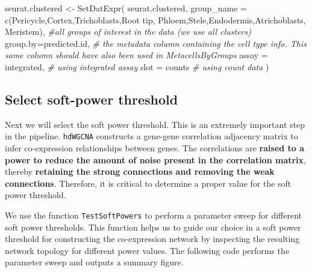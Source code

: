 \documentclass[
  letterpaper,
  DIV=11,
  numbers=noendperiod]{scrartcl}
\newenvironment{Shaded}{\begin{snugshade}}{\end{snugshade}}
\newcommand{\AttributeTok}[1]{\textcolor[rgb]{0.49,0.56,0.16}{#1}}
\newcommand{\CommentTok}[1]{\textcolor[rgb]{0.38,0.63,0.69}{\textit{#1}}}
\newcommand{\FunctionTok}[1]{\textcolor[rgb]{0.02,0.16,0.49}{#1}}
\newcommand{\NormalTok}[1]{\textcolor[rgb]{0.00,0.44,0.13}{#1}}
\newcommand{\OtherTok}[1]{\textcolor[rgb]{0.00,0.44,0.13}{#1}}
\newcommand{\StringTok}[1]{\textcolor[rgb]{0.25,0.44,0.63}{#1}}
\begin{document}
\begin{Shaded}
\begin{Highlighting}[]
\NormalTok{seurat.clustered }\OtherTok{\textless{}{-}} \FunctionTok{SetDatExpr}\NormalTok{(}
\NormalTok{  seurat.clustered,}
  \AttributeTok{group\_name =} \FunctionTok{c}\NormalTok{(}\StringTok{\textquotesingle{}Pericycle\textquotesingle{}}\NormalTok{,}\StringTok{\textquotesingle{}Cortex\textquotesingle{}}\NormalTok{,}\StringTok{\textquotesingle{}Trichoblasts\textquotesingle{}}\NormalTok{,}\StringTok{\textquotesingle{}Root tip\textquotesingle{}}\NormalTok{,}
                 \StringTok{\textquotesingle{}Phloem\textquotesingle{}}\NormalTok{,}\StringTok{\textquotesingle{}Stele\textquotesingle{}}\NormalTok{,}\StringTok{\textquotesingle{}Endodermis\textquotesingle{}}\NormalTok{,}\StringTok{\textquotesingle{}Atrichoblasts\textquotesingle{}}\NormalTok{,}
                 \StringTok{\textquotesingle{}Meristem\textquotesingle{}}\NormalTok{), }\CommentTok{\#all groups of interest in the data (we use all clusters)}
  \AttributeTok{group.by=}\StringTok{\textquotesingle{}predicted.id\textquotesingle{}}\NormalTok{, }\CommentTok{\# the metadata column containing the cell type info. This same column should have also been used in MetacellsByGroups}
  \AttributeTok{assay =} \StringTok{\textquotesingle{}integrated\textquotesingle{}}\NormalTok{, }\CommentTok{\# using integrated assay}
  \AttributeTok{slot =} \StringTok{\textquotesingle{}counts\textquotesingle{}} \CommentTok{\# using count data}
\NormalTok{)}
\end{Highlighting}
\end{Shaded}

\hypertarget{select-soft-power-threshold}{%
\subsection{Select soft-power
threshold}\label{select-soft-power-threshold}}

Next we will select the soft power threshold. This is an extremely
important step in the pipeline. \texttt{hdWGCNA} constructs a gene-gene
correlation adjacency matrix to infer co-expression relationships
between genes. The correlations are \textbf{raised to a power to reduce
the amount of noise present in the correlation matrix}, thereby
\textbf{retaining the strong connections and removing the weak
connections}. Therefore, it is critical to determine a proper value for
the soft power threshold.

We use the function \texttt{TestSoftPowers} to perform a parameter sweep
for different soft power thresholds. This function helps us to guide our
choice in a soft power threshold for constructing the co-expression
network by inspecting the resulting network topology for different power
values. The following code performs the parameter sweep and outputs a
summary figure.
\end{document}
